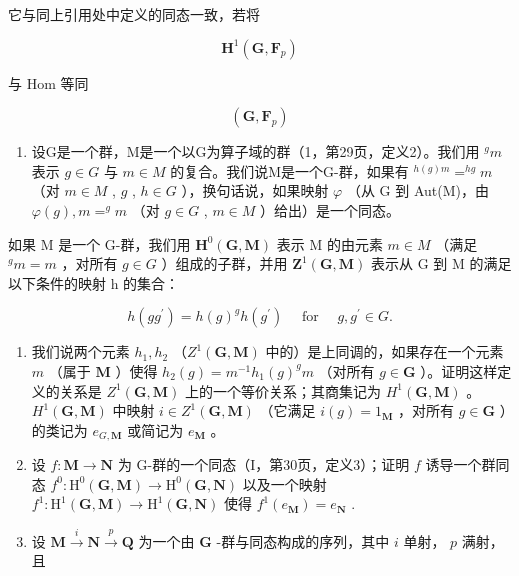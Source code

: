 它与同上引用处中定义的同态一致，若将

\[
\mathbf {H} ^ {1} (\mathbf {G}, \mathbf {F} _ {p})
\]

与 Hom 等同

\[
(\mathbf {G}, \mathbf {F} _ {p})
\]

\begin{enumerate}
\def\labelenumi{\arabic{enumi})}
\setcounter{enumi}{22}
\tightlist
\item
  设G是一个群，M是一个以G为算子域的群（1，第29页，定义2）。我们用 \(^{g}m\) 表示 \(g \in G\) 与 \(m \in M\) 的复合。我们说M是一个G-群，如果有 \(^{h(g)m} = ^{hg}m\) （对 \(m \in M\) , \(g\) , \(h \in G\) ），换句话说，如果映射 \(\varphi\) （从 G 到 Aut(M)，由 \(\varphi(g), m = ^{g}m\) （对 \(g \in G\) , \(m \in M\) ）给出）是一个同态。
\end{enumerate}

如果 M 是一个 G-群，我们用 \(\mathbf{H}^{0}(\mathbf{G},\mathbf{M})\) 表示 M 的由元素 \(m\in M\) （满足 \(^{g}m=m\) ，对所有 \(g\in G\) ）组成的子群，并用 \(\mathbf{Z}^{1}(\mathbf{G},\mathbf{M})\) 表示从 G 到 M 的满足以下条件的映射 h 的集合：

\[
h (g g ^ {\prime}) = h (g) ^ {g} h (g ^ {\prime}) \quad \text { for } \quad g, g ^ {\prime} \in G.
\]

\begin{enumerate}
\def\labelenumi{\alph{enumi})}
\item
  我们说两个元素 \(h_1, h_2\) （\(Z^1(\mathbf{G}, \mathbf{M})\) 中的）是上同调的，如果存在一个元素 \(m\) （属于 \(\mathbf{M}\) ）使得 \(h_2(g) = m^{-1} h_1(g)^g m\) （对所有 \(g \in \mathbf{G}\) ）。证明这样定义的关系是 \(Z^1(\mathbf{G}, \mathbf{M})\) 上的一个等价关系；其商集记为 \(H^1(\mathbf{G}, \mathbf{M})\) 。\(H^1(\mathbf{G}, \mathbf{M})\) 中映射 \(i \in Z^1(\mathbf{G}, \mathbf{M})\) （它满足 \(i(g) = 1_{\mathbf{M}}\) ，对所有 \(g \in \mathbf{G}\) ）的类记为 \(e_{G,\mathbf{M}}\) 或简记为 \(e_{\mathbf{M}}\) 。
\item
  设 \(f: \mathbf{M} \to \mathbf{N}\) 为 G-群的一个同态（I，第30页，定义3）；证明 \(f\) 诱导一个群同态 \(f^{0}: \mathrm{H}^{0}(\mathbf{G}, \mathbf{M}) \to \mathrm{H}^{0}(\mathbf{G}, \mathbf{N})\) 以及一个映射 \(f^{1}: \mathrm{H}^{1}(\mathbf{G}, \mathbf{M}) \to \mathrm{H}^{1}(\mathbf{G}, \mathbf{N})\) 使得 \(f^{1}(e_{\mathbf{M}}) = e_{\mathbf{N}}\) .
\item
  设 \(\mathbf{M} \xrightarrow{i} \mathbf{N} \xrightarrow{p} \mathbf{Q}\) 为一个由 \(\mathbf{G}\) -群与同态构成的序列，其中 \(i\) 单射， \(p\) 满射，且
\end{enumerate}

